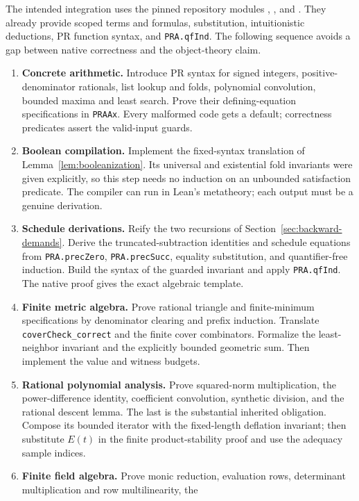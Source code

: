 The intended integration uses the pinned repository modules
, , and 
\cite{repo-core}. They already provide scoped terms and formulas,
substitution, intuitionistic deductions, PR function syntax, and
\texttt{PRA.qfInd}. The following sequence avoids a gap between
native correctness and the object-theory claim.
\begin{enumerate}
\item \textbf{Concrete arithmetic.} Introduce PR syntax for signed
integers, positive-denominator rationals, list lookup and folds,
polynomial convolution, bounded maxima and least search. Prove their
defining-equation specifications in \texttt{PRAAx}. Every malformed code
gets a default; correctness predicates assert the valid-input guards.
\item \textbf{Boolean compilation.} Implement the fixed-syntax
translation of Lemma~\ref{lem:booleanization}. Its universal and
existential fold invariants were given explicitly, so this step needs
no induction on an unbounded satisfaction predicate. The compiler can
run in Lean's metatheory; each output must be a genuine derivation.
\item \textbf{Schedule derivations.} Reify the two recursions of
Section~\ref{sec:backward-demands}. Derive the truncated-subtraction
identities and schedule equations from \texttt{PRA.precZero},
\texttt{PRA.precSucc}, equality substitution, and quantifier-free
induction. Build the syntax of the guarded invariant and apply
\texttt{PRA.qfInd}. The native proof gives the exact algebraic template.
\item \textbf{Finite metric algebra.} Prove rational triangle and
finite-minimum specifications by denominator clearing and prefix
induction. Translate \texttt{coverCheck\_correct} and the finite cover
combinators. Formalize the least-neighbor invariant and the explicitly
bounded geometric sum. Then implement the value and witness budgets.
\item \textbf{Rational polynomial analysis.} Prove squared-norm
multiplication, the power-difference identity, coefficient convolution,
synthetic division, and the rational descent lemma. The last is the
substantial inherited obligation. Compose its bounded iterator with
the fixed-length deflation invariant; then substitute $E(t)$ in the
finite product-stability proof and use the adequacy sample indices.
\item \textbf{Finite field algebra.} Prove monic reduction, evaluation
rows, determinant multiplication and row multilinearity, the

\end{enumerate}
